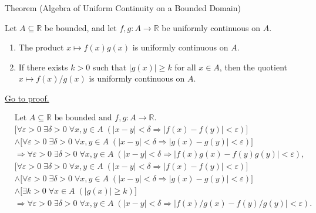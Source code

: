\begin{theorembox}{Theorem (Algebra of Uniform Continuity on a Bounded Domain)}
\begin{theorem}
\label{thm:algebra-of-uniform-continuity-bounded}
Let $A \subseteq \mathbb{R}$ be bounded, and let $f,g:A \to \mathbb{R}$ be uniformly continuous on $A$.
\begin{enumerate}[label=(\alph*)]
\item The product $x \mapsto f(x)g(x)$ is uniformly continuous on $A$.
\item If there exists $k>0$ such that $|g(x)| \ge k$ for all $x \in A$, then the quotient $x \mapsto f(x)/g(x)$ is uniformly continuous on $A$.
\end{enumerate}
\hyperref[prf:algebra-of-uniform-continuity-bounded]{Go to proof.}
\end{theorem}
\end{theorembox}

\begin{remark*}
\[
\begin{aligned}
&\text{Let } A \subseteq \mathbb{R} \text{ be bounded and } f,g:A \to \mathbb{R}.\\
&\bigl[\forall \varepsilon > 0\; \exists \delta > 0\; \forall x,y \in A\;(|x-y|<\delta \Rightarrow |f(x)-f(y)|<\varepsilon)\bigr]\\
&\land \bigl[\forall \varepsilon > 0\; \exists \delta > 0\; \forall x,y \in A\;(|x-y|<\delta \Rightarrow |g(x)-g(y)|<\varepsilon)\bigr]\\
&\Rightarrow \forall \varepsilon > 0\; \exists \delta > 0\; \forall x,y \in A\;(|x-y|<\delta \Rightarrow |f(x)g(x)-f(y)g(y)|<\varepsilon),\\
&\bigl[\forall \varepsilon > 0\; \exists \delta > 0\; \forall x,y \in A\;(|x-y|<\delta \Rightarrow |f(x)-f(y)|<\varepsilon)\bigr]\\
&\land \bigl[\forall \varepsilon > 0\; \exists \delta > 0\; \forall x,y \in A\;(|x-y|<\delta \Rightarrow |g(x)-g(y)|<\varepsilon)\bigr]\\
&\land \bigl[\exists k>0\; \forall x \in A\;(|g(x)| \ge k)\bigr]\\
&\Rightarrow \forall \varepsilon > 0\; \exists \delta > 0\; \forall x,y \in A\;(|x-y|<\delta \Rightarrow |f(x)/g(x)-f(y)/g(y)|<\varepsilon).
\end{aligned}
\]
\end{remark*}

